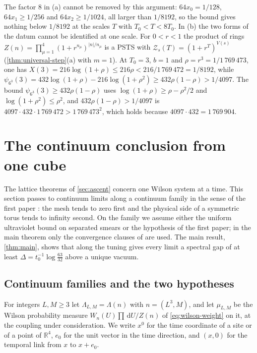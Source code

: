 \documentclass[11pt,a4paper]{amsart}
\theoremstyle{definition}
\theoremstyle{remark}
\numberwithin{equation}{section}
\newcommand{\R}{\mathbb{R}}          %
\newcommand{\dd}{\,\mathrm{d}}             %
\newcommand{\PSTS}{\textup{PSTS}}          %
\newcommand{\TT}{\mathbb{T}}               %
\newcommand{\Zc}{\mathcal{Z}}              %
\newcommand{\Zs}[2]{\Zc_{#1}(#2)}          %
\newcommand{\psiT}[2]{\psi_{#1}(#2)}       %
\newcommand{\Vol}[1]{V(#1)}                %
\newcommand{\dconst}{\frac{1}{4097}}       %
\newcommand{\xconst}{\frac{1}{8192}}       %
\newcommand{\dconstinl}{1/4097}            %
\newcommand{\xconstinl}{1/8192}            %
\newcommand{\Mcirc}{\text{\upshape(M$^{\circ}$)}}   %
\newcommand{\hypW}{\text{\upshape(W)}}              %
\newcommand{\UVB}{\text{\upshape(UVB)}}             %
\newcommand{\tzero}{t_0}                   %
\begin{document}
The factor $8$ in (a) cannot be removed by this argument: $64x_0=1/128$, $64x_1\ge1/256$ and $64x_2\ge1/1024$, all larger than $\xconstinl$, so the bound gives nothing below $\xconstinl$ at the scales $T$ with $T_0<T<8T_0$. In (b) the two forms of the datum cannot be identified at one scale. For $0<r<1$ the product of rings $Z(n)=\prod_{\mu=1}^4(1+r^{n_\mu})^{|n|/n_\mu}$ is a \PSTS{} with $\Zs{s}{T}=(1+r^T)^{\Vol{s}}$ (\cref{thm:universal-step}(a) with $m=1$). At $T_0=3$, $b=1$ and $\rho=r^3=1/1\,769\,473$, one has $X(3)=216\log(1+\rho)\le216\rho<216/1\,769\,472=\xconstinl$, while $\psiT{6^3}{3}=432\log(1+\rho)-216\log(1+\rho^2)\ge432\rho(1-\rho)>\dconstinl$. The bound $\psiT{6^3}{3}\ge432\rho(1-\rho)$ uses $\log(1+\rho)\ge\rho-\rho^2/2$ and $\log(1+\rho^2)\le\rho^2$, and $432\rho(1-\rho)>\dconstinl$ is $4097\cdot432\cdot1\,769\,472>1\,769\,473^2$, which holds because $4097\cdot432=1\,769\,904$.
\section{The continuum conclusion from one cube}\label{sec:continuum}

The lattice theorems of \cref{sec:ascent} concern one Wilson system at a time. This section passes to continuum limits along a continuum family in the sense of the first paper \cite{bhattacharjee2026first}: the mesh tends to zero first and the physical side of a symmetric torus tends to infinity second. On the family we assume either the uniform ultraviolet bound \UVB{} on separated smears or the hypothesis \hypW{} of the first paper; in the main theorem only the convergence clauses of \hypW{} are used. The main result, \cref{thm:main}, shows that \Mcirc{} along the tuning gives every limit a spectral gap of at least $\Delta=\tzero^{-1}\log\frac{63}{32}$ above a unique vacuum.

\subsection{Continuum families and the two hypotheses}

For integers $L,M\ge3$ let $\Lambda_{L,M}=\Lambda(n)$ with $n=(L^3,M)$, and let $\mu_{L,M}$ be the Wilson probability measure $W_n(U)\prod\dd U/Z(n)$ of \eqref{eq:wilson-weight} on it, at the coupling under consideration. We write $x^0$ for the time coordinate of a site or of a point of $\R^4$, $e_0$ for the unit vector in the time direction, and $(x,0)$ for the temporal link from $x$ to $x+e_0$.
\end{document}
